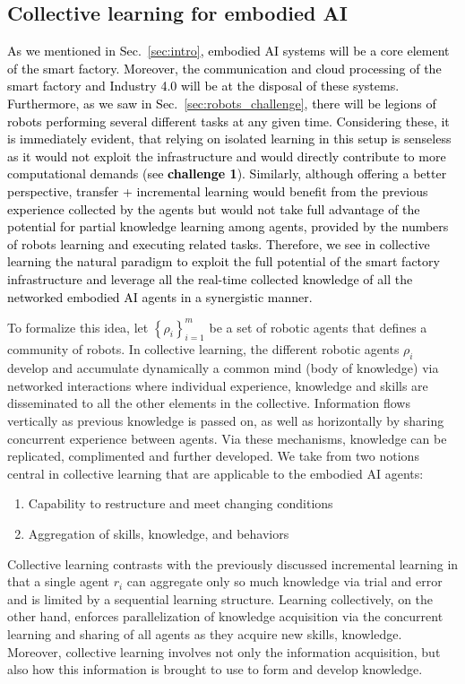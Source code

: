 \subsection{Collective learning for embodied AI}
\textcolor{black}{As we mentioned in Sec.~\ref{sec:intro}, embodied AI systems will be a core element of the smart factory. Moreover, the communication and cloud processing of the smart factory and Industry 4.0 will be at the disposal of these systems. Furthermore, as we saw in Sec.~\ref{sec:robots_challenge}, there will be legions of robots performing several different tasks at any given time. Considering these, it is immediately evident, that relying on isolated learning in this setup is senseless as it would not exploit the infrastructure and would directly contribute to more computational demands (see \textbf{challenge 1}). Similarly, although offering a better perspective, transfer + incremental learning would benefit from the previous experience collected by the agents but would not take full advantage of the potential for partial knowledge learning among agents, provided by the numbers of robots learning and executing related tasks. Therefore, we see in collective learning the natural paradigm to exploit the full potential of the smart factory infrastructure and leverage all the real-time collected knowledge of all the networked embodied AI agents in a synergistic manner.}

To formalize this idea, let $ \left\lbrace \rho_i \right\rbrace_{i=1}^{m} $ be a set of robotic agents that defines a community of robots. In collective learning, the different robotic agents $ \rho_i $ develop and accumulate dynamically a common mind (body of knowledge) via networked interactions where individual experience, knowledge and skills are disseminated to all the other elements in the collective. Information flows vertically as previous knowledge is passed on, as well as horizontally by sharing concurrent experience between agents. Via these mechanisms, knowledge can be replicated, complimented and further developed. We take from \cite{Garavan2012CollectiveLearning} two notions central in collective learning that are applicable to the embodied AI agents:
\begin{enumerate}
	\item Capability to restructure and meet changing conditions
	\item Aggregation of skills, knowledge, and behaviors
\end{enumerate}
Collective learning contrasts with the previously discussed incremental learning in that a single agent $ r_i $ can aggregate only so much knowledge via trial and error and is limited by a sequential learning structure. Learning collectively, on the other hand, enforces parallelization of knowledge acquisition via the concurrent learning and sharing of all agents as they acquire new skills, knowledge. Moreover, collective learning involves not only the information acquisition, but also how this information is brought to use to form and develop knowledge. 

